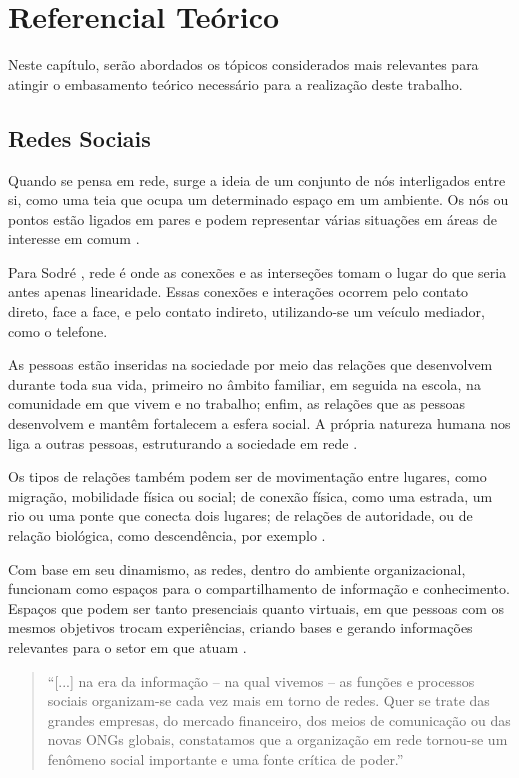 \chapter{Referencial Teórico}
\label{chapter:Referencial_Teorico}

Neste capítulo, serão abordados os tópicos considerados mais relevantes para atingir o embasamento teórico necessário para a realização deste trabalho.

\section{Redes Sociais}

Quando se pensa em rede, surge a ideia de um conjunto de nós interligados entre si, como uma teia que ocupa um determinado espaço em um ambiente. Os nós ou pontos estão ligados em pares e podem representar várias situações em áreas de interesse em comum \cite{Newman:2010}.

Para Sodré \cite{Sodre:2002}, rede é onde as conexões e as interseções tomam o lugar do que seria antes apenas linearidade. Essas conexões e interações ocorrem pelo contato direto, face a face, e pelo contato indireto, utilizando-se um veículo mediador, como o telefone.

As pessoas estão inseridas na sociedade por meio das relações que desenvolvem durante toda sua vida, primeiro no âmbito familiar, em seguida na escola, na comunidade em que vivem e no trabalho; enfim, as relações que as pessoas desenvolvem e mantêm fortalecem a esfera social. A própria natureza humana nos liga a outras pessoas, estruturando a sociedade em rede \cite{Tomae:Alcara:Chiara:2005}.

Os tipos de relações também podem ser de movimentação entre lugares, como migração, mobilidade física ou social; de conexão física, como uma estrada, um rio ou uma ponte que conecta dois lugares; de relações de autoridade, ou de relação biológica, como descendência, por exemplo \cite{Wasserman:1994}.

Com base em seu dinamismo, as redes, dentro do ambiente organizacional, funcionam como espaços para o compartilhamento de informação e conhecimento. Espaços que podem ser tanto presenciais quanto virtuais, em que pessoas com os mesmos objetivos trocam experiências, criando bases e gerando informações relevantes para o setor em que atuam \cite{Tomae:Alcara:Chiara:2005}.

\begin{quote}
	``[...] na era da informação – na qual vivemos – as
	funções e processos sociais organizam-se cada vez
	mais em torno de redes. Quer se trate das grandes
	empresas, do mercado financeiro, dos meios de
	comunicação ou das novas ONGs globais,
	constatamos que a organização em rede tornou-se
	um fenômeno social importante e uma fonte crítica
	de poder.'' \cite{Capra:2002}
\end{quote}

